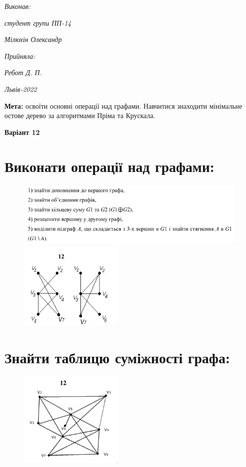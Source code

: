 \documentclass{article}
\begin{document}
\vspace{12.1pt} %
	{\fontsize{14}{22.4}\selectfont
\begin{flushright}
	\textit{Виконав:}

	\textit{студент групи ПП-14}

	\textit{Мілюхін Олександр}

	\textit{Прийняла:}

	\textit{Ребот Д. П.}
\end{flushright}
\vspace{37.4pt} %
\begin{center}
\textit{Львів-2022}
\vspace{37.4pt} %
\end{center}
	}
{\fontsize{14}{16.1}\selectfont
\textbf{Мета:}
освоїти основні операції над графами. Навчитися знаходити
мінімальне остове дерево за алгоритмами Пріма та Крускала.

\vspace{16pt}
\centering \textbf{Варіант 12}
\section{Виконати операції над графами:}
\begin{figure}[h]
	\centering
	\includegraphics[width=17cm]{1.png}
	\includegraphics[width=5cm]{2.png}
\end{figure}
\section{Знайти таблицю суміжності графа:}
\begin{figure}[h]
	\centering
	\includegraphics[width=5cm]{3.png}
\end{figure}
}
\end{document}
